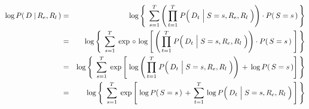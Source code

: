 \begin{eqnarray*}
\log P\!\left(\,D \;\vert\, R_{e},R_{l}\,\right)
&=&
	\log\left\{\;\,
		\overset{T}{\underset{s=1}{\sum}}
		\left(\,
			\overset{T}{\underset{t=1}{\prod}}\;
			P\!\left(\,D_{t} \,\left\vert\; S\overset{{\color{white}1}}{=}s,R_{e},R_{l}\right.\,\right)
			\right)
		\cdot
		P\!\left(\,S=s\,\right)
		\,\right\}
\\
& = &
	\log\left\{\;\,
	\overset{T}{\underset{s=1}{\sum}}\;
	\exp\,\circ\,\log\left[\,
		\left(\,
			\overset{T}{\underset{t=1}{\prod}}\;
			P\!\left(\,D_{t} \,\left\vert\; S\overset{{\color{white}1}}{=}s,R_{e},R_{l}\right.\,\right)
			\right)
		\cdot
		P\!\left(\,S=s\,\right)
		\;\right]
	\,\right\}
\\
& = &
	\log\left\{\;\,
	\overset{T}{\underset{s=1}{\sum}}\;
	\exp\left[\;
		\log\left(\,
			\overset{T}{\underset{t=1}{\prod}}\;
			P\!\left(\,D_{t} \,\left\vert\; S\overset{{\color{white}1}}{=}s,R_{e},R_{l}\right.\,\right)
			\right)
		\, + \,
		\log P\!\left(\,S=s\,\right)
		\right]
	\,\right\}
\\
& = &
	\log\left\{\;\,
	\overset{T}{\underset{s=1}{\sum}}\;
	\exp\left[\;\log P\!\left(\,S=s\,\right)
			\, + \,
			\overset{T}{\underset{t=1}{\sum}}\,
				\log P\!\left(\,D_{t} \,\left\vert\; S\overset{{\color{white}1}}{=}s,R_{e},R_{l}\right.\,\right)
		\,\right]
	\,\right\}
\end{eqnarray*}


